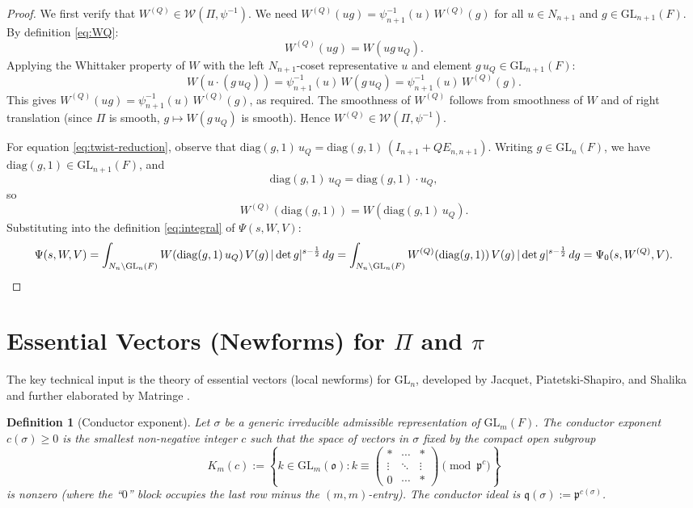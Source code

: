 \documentclass[12pt]{article}
\newtheorem{definition}[theorem]{Definition}
\begin{document}
\begin{proof}
We first verify that $W^{(Q)} \in \mathcal{W}(\Pi,\psi^{-1})$.  We need
$W^{(Q)}(ug) = \psi^{-1}_{n+1}(u)\,W^{(Q)}(g)$ for all $u \in N_{n+1}$ and
$g \in \mathrm{GL}_{n+1}(F)$.  By definition \eqref{eq:WQ}:
\[
  W^{(Q)}(ug) = W(ug\,u_Q).
\]
Applying the Whittaker property of $W$ with the left $N_{n+1}$-coset
representative $u$ and element $g\,u_Q \in \mathrm{GL}_{n+1}(F)$:
\[
  W(u\cdot(g\,u_Q)) = \psi^{-1}_{n+1}(u)\,W(g\,u_Q) = \psi^{-1}_{n+1}(u)\,W^{(Q)}(g).
\]
This gives $W^{(Q)}(ug) = \psi^{-1}_{n+1}(u)\,W^{(Q)}(g)$, as required.
The smoothness of $W^{(Q)}$ follows from smoothness of $W$ and of right
translation (since $\Pi$ is smooth, $g \mapsto W(g\,u_Q)$ is smooth).
Hence $W^{(Q)} \in \mathcal{W}(\Pi,\psi^{-1})$.

For equation \eqref{eq:twist-reduction}, observe that
$\mathrm{diag}(g,1)\,u_Q = \mathrm{diag}(g,1)\,(I_{n+1}+QE_{n,n+1})$.
Writing $g \in \mathrm{GL}_n(F)$, we have $\mathrm{diag}(g,1) \in
\mathrm{GL}_{n+1}(F)$, and
\[
  \mathrm{diag}(g,1)\,u_Q = \mathrm{diag}(g,1) \cdot u_Q,
\]
so
\[
  W^{(Q)}(\mathrm{diag}(g,1)) = W(\mathrm{diag}(g,1)\,u_Q).
\]
Substituting into the definition \eqref{eq:integral} of $\Psi(s,W,V)$:
\[
  \Psi(s,W,V)
  = \int_{N_n\backslash\mathrm{GL}_n(F)} W(\mathrm{diag}(g,1)\,u_Q)\,V(g)\,
    |\det g|^{s-\frac{1}{2}}\,dg
  = \int_{N_n\backslash\mathrm{GL}_n(F)} W^{(Q)}(\mathrm{diag}(g,1))\,V(g)\,
    |\det g|^{s-\frac{1}{2}}\,dg
  = \Psi_0(s, W^{(Q)}, V). \qedhere
\]
\end{proof}

\section{Essential Vectors (Newforms) for \texorpdfstring{$\Pi$}{Pi} and
\texorpdfstring{$\pi$}{pi}}

The key technical input is the theory of essential vectors (local newforms) for
$\mathrm{GL}_n$, developed by Jacquet, Piatetski-Shapiro, and Shalika
\cite{JPSS81} and further elaborated by Matringe \cite{Matringe13}.

\begin{definition}[Conductor exponent]\label{def:conductor}
Let $\sigma$ be a generic irreducible admissible representation of
$\mathrm{GL}_m(F)$.  The conductor exponent $c(\sigma) \geq 0$ is the smallest
non-negative integer $c$ such that the space of vectors in $\sigma$ fixed by the
compact open subgroup
\[
  K_m(c) := \left\{ k \in \mathrm{GL}_m(\mathfrak{o}) :
    k \equiv \begin{pmatrix} * & \cdots & * \\ \vdots & \ddots & \vdots \\
    0 & \cdots & * \end{pmatrix} \pmod{\mathfrak{p}^c} \right\}
\]
is nonzero \textup{(}where the ``$0$'' block occupies the last row minus the
$(m,m)$-entry\textup{)}.  The conductor ideal is $\mathfrak{q}(\sigma) :=
\mathfrak{p}^{c(\sigma)}$.
\end{definition}
\end{document}
